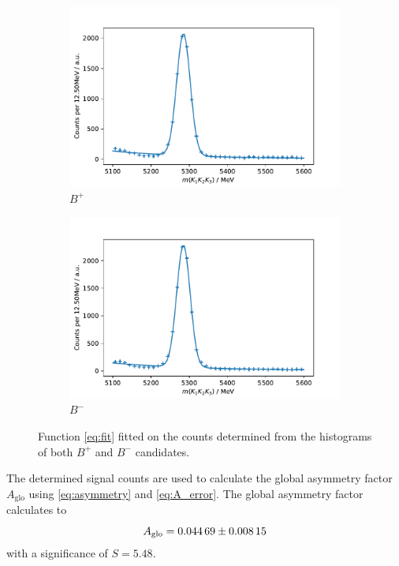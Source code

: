 \begin{figure}[H]
	\centering
	\begin{subfigure}{0.45\textwidth}
		\includegraphics[width=\textwidth]{content/pictures/image_fin/invmassFitBN.pdf}
		\caption{$B^+$}
	\end{subfigure}
	\begin{subfigure}{0.45\textwidth}
		\includegraphics[width=\textwidth]{content/pictures/image_fin/invmassFitBP.pdf}
		\caption{$B^-$}
	\end{subfigure} 
	\caption{Function \autoref{eq:fit} fitted on the counts determined from the histograms of both $B^+$ and $B^-$ candidates.}
	\label{fig:fits}
\end{figure}

The determined signal counts are used to calculate the global asymmetry factor $A_\mathrm{glo}$ using \eqref{eq:asymmetry} and \eqref{eq:A_error}.  The global asymmetry factor calculates to 
\begin{equation}
	A_\mathrm{glo} = \num{0.04469\pm0.00815}
\end{equation}
with a significance of $S = 5.48$. \\

